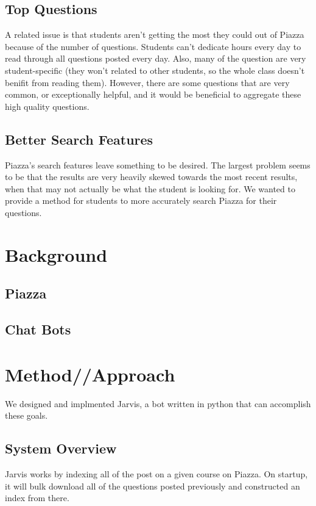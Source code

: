 \documentclass[sigconf]{acmart}
\begin{document}
\subsection{Top Questions}
A related issue is that students aren't getting the most they could out of Piazza because of the number of questions. Students can't dedicate hours every day to read through all questions posted every day. Also, many of the question are very student-specific (they won't related to other students, so the whole class doesn't benifit from reading them). However, there are some questions that are very common, or exceptionally helpful, and it would be beneficial to aggregate these high quality questions.

\subsection{Better Search Features}
Piazza's search features leave something to be desired. The largest problem seems to be that the results are very heavily skewed towards the most recent results, when that may not actually be what the student is looking for. We wanted to provide a method for students to more accurately search Piazza for their questions.

\section{Background}
\subsection{Piazza}
\subsection{Chat Bots}

\section{Method//Approach}
We designed and implmented Jarvis, a bot written in python that can accomplish these goals. 

\subsection{System Overview}
Jarvis works by indexing all of the post on a given course on Piazza. On startup, it will bulk download all of the questions posted previously and constructed an index from there.
\end{document}
